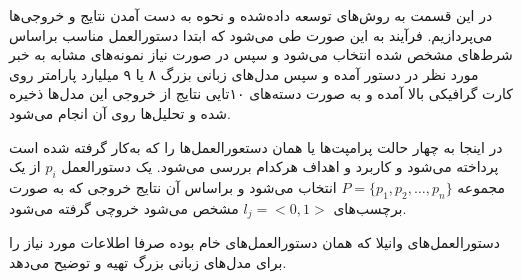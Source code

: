 
در این قسمت به روش‌های توسعه داده‌شده و نحوه به دست آمدن نتایج و خروجی‌ها می‌پردازیم. فرآیند به این صورت طی می‌شود که ابتدا دستورالعمل مناسب براساس شرط‌های مشخص شده انتخاب می‌شود و سپس در صورت نیاز نمونه‌های مشابه به خبر مورد نظر در دستور آمده و سپس مدل‌های زبانی‌ بزرگ ۸ یا ۹ میلیارد پارامتر روی کارت گرافیکی بالا آمده و به صورت دسته‌های ۱۰‌تایی نتایج از خروجی این مدل‌ها ذخیره شده و تحلیل‌ها روی آن انجام می‌شود.

در اینجا به چهار حالت پرامپت‌ها یا همان دستعورالعمل‌ها را که به‌کار گرفته شده است پرداخته می‌شود و کاربرد و اهداف هرکدام بررسی می‌شود. یک دستورالعمل
$p_i$
از یک مجموعه
$P = \{p_1, p_2, \dots, p_n\}$
انتخاب می‌شود و براساس آن نتایج خروجی که به صورت برچسب‌های
$l_j = <0,1>$
مشخص می‌شود خروچی گرفته می‌شود.

دستورالعمل‌های وانیلا که همان دستورالعمل‌های خام بوده صرفا اطلاعات مورد نیاز را برای مدل‌های زبانی بزرگ تهیه و توضیح می‌دهد.